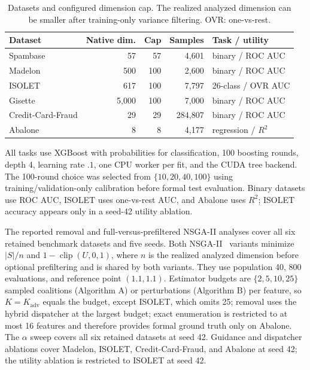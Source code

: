 \documentclass{article}
\begin{document}
\begin{table}[H]
\caption{Datasets and configured dimension cap. The realized analyzed dimension can be smaller after training-only variance filtering. OVR: one-vs-rest.}
\label{tab:datasets}
\centering
\footnotesize
\begin{tabular}{lrrrl}
\toprule
Dataset & Native dim. & Cap & Samples & Task / utility \\
\midrule
Spambase & 57 & 57 & 4,601 & binary / ROC AUC \\
Madelon & 500 & 100 & 2,600 & binary / ROC AUC \\
ISOLET & 617 & 100 & 7,797 & 26-class / OVR AUC \\
Gisette & 5,000 & 100 & 7,000 & binary / ROC AUC \\
Credit-Card-Fraud & 29 & 29 & 284,807 & binary / ROC AUC \\
Abalone & 8 & 8 & 4,177 & regression / $R^2$ \\
\bottomrule
\end{tabular}
\end{table}

All tasks use XGBoost with probabilities for classification, 100 boosting rounds, depth 4, learning rate $.1$, one CPU worker per fit, and the CUDA tree backend. The 100-round choice was selected from $\{10,20,40,100\}$ using training/validation-only calibration before formal test evaluation. Binary datasets use ROC AUC, ISOLET uses one-vs-rest AUC, and Abalone uses $R^2$; ISOLET accuracy appears only in a seed-42 utility ablation.

The reported removal and full-versus-prefiltered NSGA-II analyses cover all six retained benchmark datasets and five seeds. Both NSGA-II~\citep{deb2002fast,hamdani2007multi} variants minimize $|S|/$$n$ and $1-\operatorname{clip}(U,0,1)$, where $n$ is the realized analyzed dimension before optional prefiltering and is shared by both variants. They use population 40, 800 evaluations, and reference point $(1.1,1.1)$. Estimator budgets are $\{2,5,10,25\}$ sampled coalitions (Algorithm A) or perturbations (Algorithm B) per feature, so $K=K_{\mathrm{adv}}$ equals the budget, except ISOLET, which omits 25; removal uses the hybrid dispatcher at the largest budget; exact enumeration is restricted to at most 16 features and therefore provides formal ground truth only on Abalone. The $\alpha$ sweep covers all six retained datasets at seed 42. Guidance and dispatcher ablations cover Madelon, ISOLET, Credit-Card-Fraud, and Abalone at seed 42; the utility ablation is restricted to ISOLET at seed 42.
\end{document}
